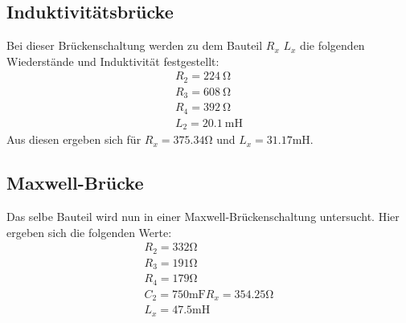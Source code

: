\subsection{Induktivitätsbrücke}
  Bei dieser Brückenschaltung werden zu dem Bauteil $R_x$ $L_x$ die folgenden Wiederstände 
  und Induktivität festgestellt:
  \begin{align*}
    R_2 = \SI{224}{\ohm}\\
    R_3 = \SI{608}{\ohm}\\
    R_4 = \SI{392}{\ohm}\\
    L_2 = \SI{20.1}{\milli\henry}
  \end{align*}
  Aus diesen ergeben sich für $R_x = 375.34 \si{\ohm}$ und $L_x = 31.17 \si{\milli\henry}$.
  
\subsection{Maxwell-Brücke}
  Das selbe Bauteil wird nun in einer Maxwell-Brückenschaltung untersucht. Hier ergeben 
  sich die folgenden Werte:
  \begin{align*}
    R_2=332\si{\ohm}\\
    R_3 = 191 \si{\ohm}\\
    R_4 = 179 \si{\ohm}\\
    C_2 = 750 \si{\milli\farad}
    R_x = 354.25 \si{\ohm}\\
    L_x = 47.5 \si{\milli\henry}
  \end{align*}

